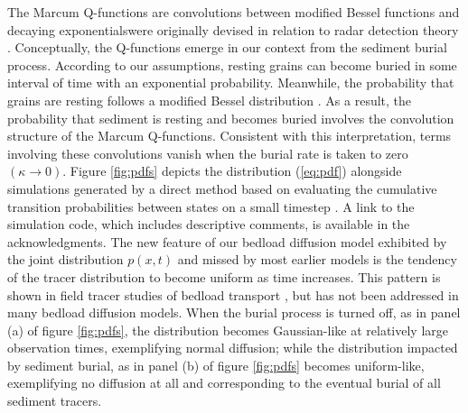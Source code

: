 \documentclass[draft,grl]{agujournal2018}
\begin{document}
The Marcum Q-functions are convolutions between modified Bessel functions and decaying exponentialswere originally devised in relation to radar detection theory \citep{Marcum1960}. 
Conceptually, the Q-functions emerge in our context from the sediment burial process. According to our assumptions, resting grains can become buried in some interval of time with an exponential probability. Meanwhile, the probability that grains are resting  follows a modified Bessel distribution \citep[e.g.,][]{Einstein1937,Lisle1998}.
As a result, the probability that sediment is resting and becomes buried involves the convolution structure of the Marcum Q-functions.
Consistent with this interpretation, terms involving these convolutions vanish when the burial rate is taken to zero $(\kappa \rightarrow 0)$.
Figure \ref{fig:pdfs} depicts the distribution (\ref{eq:pdf}) alongside simulations generated by a direct method based on evaluating the cumulative transition probabilities between states on a small timestep \citep[cf.,][]{Barik2006}. A link to the simulation code, which includes descriptive comments, is available in the acknowledgments.
The new feature of our bedload diffusion model exhibited by the joint distribution $p(x,t)$ and missed by most earlier models is the tendency of the tracer distribution to become uniform as time increases.
This pattern is shown in field tracer studies of bedload transport \citep[e.g.,][]{Hassan1994, Ferguson2002}, but has not been addressed in many bedload diffusion models.
When the burial process is turned off, as in panel (a) of figure \ref{fig:pdfs}, the distribution becomes Gaussian-like at relatively large observation times, exemplifying normal diffusion; while the distribution impacted by sediment burial, as in panel (b) of figure \ref{fig:pdfs} becomes uniform-like, exemplifying no diffusion at all and corresponding to the eventual burial of all sediment tracers. 
\end{document}
